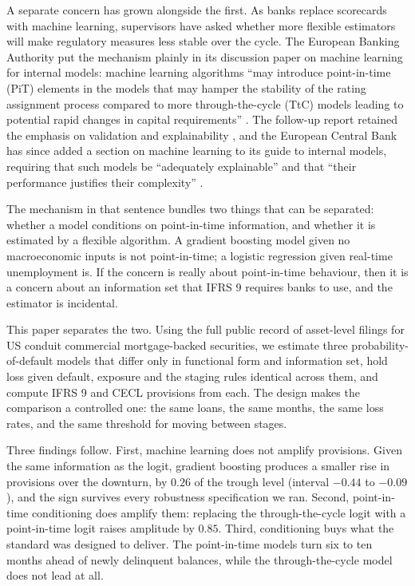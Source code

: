 \documentclass[11pt]{article}
\begin{document}
A separate concern has grown alongside the first. As banks replace scorecards with machine learning, supervisors
have asked whether more flexible estimators will make regulatory measures less stable over the cycle. The European
Banking Authority put the mechanism plainly in its discussion paper on machine learning for internal models:
machine learning algorithms ``may introduce point-in-time (PiT) elements in the models that may hamper the
stability of the rating assignment process compared to more through-the-cycle (TtC) models leading to potential
rapid changes in capital requirements'' \citep{eba2021ml}. The follow-up report retained the emphasis on
validation and explainability \citep{eba2023ml}, and the European Central Bank has since added a section on
machine learning to its guide to internal models, requiring that such models be ``adequately explainable'' and
that ``their performance justifies their complexity'' \citep{ecb2025guide}.

The mechanism in that sentence bundles two things that can be separated: whether a model conditions on
point-in-time information, and whether it is estimated by a flexible algorithm. A gradient boosting model given no
macroeconomic inputs is not point-in-time; a logistic regression given real-time unemployment is. If the concern
is really about point-in-time behaviour, then it is a concern about an information set that IFRS 9 requires banks
to use, and the estimator is incidental.

This paper separates the two. Using the full public record of asset-level filings for US conduit commercial
mortgage-backed securities, we estimate three probability-of-default models that differ only in functional form
and information set, hold loss given default, exposure and the staging rules identical across them, and compute
IFRS 9 and CECL provisions from each. The design makes the comparison a controlled one: the same loans, the same
months, the same loss rates, and the same threshold for moving between stages.

Three findings follow. First, machine learning does not amplify provisions. Given the same information as the
logit, gradient boosting produces a smaller rise in provisions over the downturn, by $0.26$ of the trough level
(interval $-0.44$ to $-0.09$), and the sign survives every robustness specification we ran. Second, point-in-time
conditioning does amplify them: replacing the through-the-cycle logit with a point-in-time logit raises amplitude
by $0.85$. Third, conditioning buys what the standard was designed to deliver. The point-in-time models turn six
to ten months ahead of newly delinquent balances, while the through-the-cycle model does not lead at all.
\end{document}

